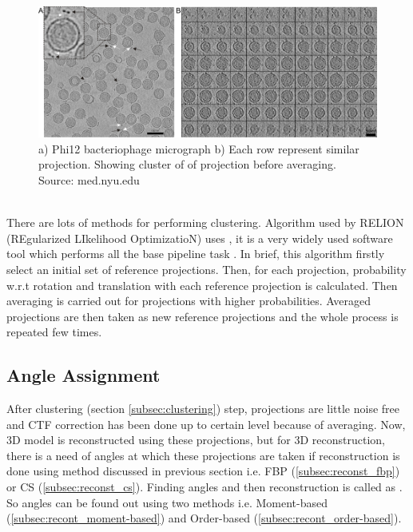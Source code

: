 \documentclass[twoside]{iitbreport}
\begin{document}
\begin{figure}[h]
\includegraphics[width=1\textwidth]{phi-12-slices_clustering}
\centering
\captionsetup{justification=centering}
\caption[Clustering]{a) Phi12 bacteriophage micrograph b) Each row represent similar projection. Showing cluster of of projection before averaging.\\Source: med.nyu.edu \protect\footnotemark}
\label{fig:clustering}
\end{figure}

\noindent\\
There are lots of methods for performing clustering. Algorithm used by RELION (REgularized LIkelihood OptimizatioN) uses , it is a very widely used software tool which performs all the base pipeline task \cite{scheres2012relion}. In brief, this algorithm firstly select an initial set of reference projections. Then, for each projection, probability w.r.t rotation and translation with each reference projection is calculated. Then averaging is carried out for projections with higher probabilities. Averaged projections are then taken as new reference projections and the whole process is repeated few times.

\subsection{Angle Assignment}
After clustering (section \ref{subsec:clustering}) step, projections are little noise free and CTF correction has been done up to certain level because of averaging. Now, 3D model is reconstructed using these projections, but for 3D reconstruction, there is a need of angles at which these projections are taken if reconstruction is done using method discussed in previous section i.e. FBP (\ref{subsec:reconst_fbp}) or CS (\ref{subsec:reconst_cs}). Finding angles and then reconstruction is called as . So angles can be found out using  two methods i.e. Moment-based (\ref{subsec:recont_moment-based}) and Order-based (\ref{subsec:recont_order-based}).
\end{document}
